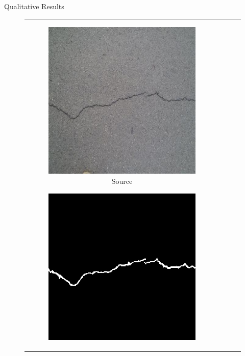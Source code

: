 \documentclass{lib/curtin_format}
\begin{document}
\begin{frame}{Qualitative Results}
    \begin{figure}[htbp]
        \begin{tabular}{cccc}
            \begin{subfigure}[b]{0.23\textwidth}
                \centering
                \includegraphics[width=\textwidth]{res/crackseg-experiment-qualitative/source.jpg}
                \caption{Source}
                \label{fig:crackseg-experiment-qualitative-source}
            \end{subfigure}
            \begin{subfigure}[b]{0.23\textwidth}
                \centering
                \includegraphics[width=\textwidth]{res/crackseg-experiment-qualitative/ground-truth.png}

\end{subfigure}
\end{tabular}
\end{figure}
\end{frame}
\end{document}
